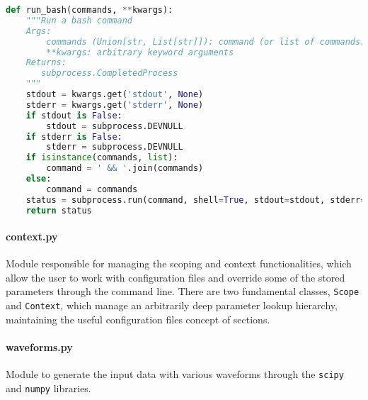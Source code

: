 \begin{lstlisting}[language=Python, morekeywords={None}]
def run_bash(commands, **kwargs):
    """Run a bash command
    Args:
        commands (Union[str, List[str]]): command (or list of commands) to be executed in the same shell
        **kwargs: arbitrary keyword arguments
    Returns:
       subprocess.CompletedProcess
    """
    stdout = kwargs.get('stdout', None)
    stderr = kwargs.get('stderr', None)
    if stdout is False:
        stdout = subprocess.DEVNULL
    if stderr is False:
        stderr = subprocess.DEVNULL
    if isinstance(commands, list):
        command = ' && '.join(commands)
    else:
        command = commands
    status = subprocess.run(command, shell=True, stdout=stdout, stderr=stderr)
    return status
\end{lstlisting}

\paragraph{context.py} Module responsible for managing the scoping and context functionalities, which allow the user to work with configuration files and override some of the stored parameters through the command line. There are two fundamental classes, \texttt{Scope} and \texttt{Context}, which manage an arbitrarily deep parameter lookup hierarchy, maintaining the useful configuration files concept of sections.

\paragraph{waveforms.py} Module to generate the input data with various waveforms through the \texttt{scipy} and \texttt{numpy} libraries.
